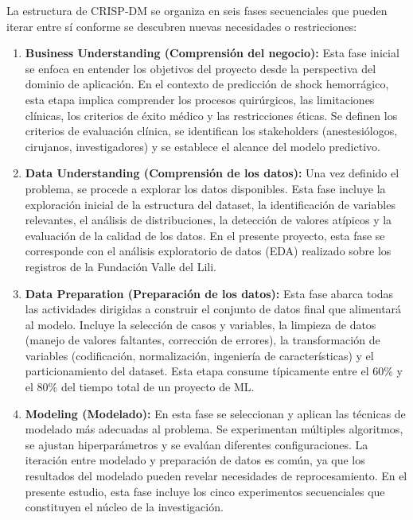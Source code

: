 La estructura de CRISP-DM se organiza en seis fases secuenciales que pueden iterar entre sí conforme se descubren nuevas necesidades o restricciones:

\begin{enumerate}
    \item \textbf{Business Understanding (Comprensión del negocio):} Esta fase inicial se enfoca en entender los objetivos del proyecto desde la perspectiva del dominio de aplicación. En el contexto de predicción de shock hemorrágico, esta etapa implica comprender los procesos quirúrgicos, las limitaciones clínicas, los criterios de éxito médico y las restricciones éticas. Se definen los criterios de evaluación clínica, se identifican los stakeholders (anestesiólogos, cirujanos, investigadores) y se establece el alcance del modelo predictivo.
    
    \item \textbf{Data Understanding (Comprensión de los datos):} Una vez definido el problema, se procede a explorar los datos disponibles. Esta fase incluye la exploración inicial de la estructura del dataset, la identificación de variables relevantes, el análisis de distribuciones, la detección de valores atípicos y la evaluación de la calidad de los datos. En el presente proyecto, esta fase se corresponde con el análisis exploratorio de datos (EDA) realizado sobre los registros de la Fundación Valle del Lili.
    
    \item \textbf{Data Preparation (Preparación de los datos):} Esta fase abarca todas las actividades dirigidas a construir el conjunto de datos final que alimentará al modelo. Incluye la selección de casos y variables, la limpieza de datos (manejo de valores faltantes, corrección de errores), la transformación de variables (codificación, normalización, ingeniería de características) y el particionamiento del dataset. Esta etapa consume típicamente entre el 60\% y el 80\% del tiempo total de un proyecto de ML.
    
    \item \textbf{Modeling (Modelado):} En esta fase se seleccionan y aplican las técnicas de modelado más adecuadas al problema. Se experimentan múltiples algoritmos, se ajustan hiperparámetros y se evalúan diferentes configuraciones. La iteración entre modelado y preparación de datos es común, ya que los resultados del modelado pueden revelar necesidades de reprocesamiento. En el presente estudio, esta fase incluye los cinco experimentos secuenciales que constituyen el núcleo de la investigación.
    

\end{enumerate}

